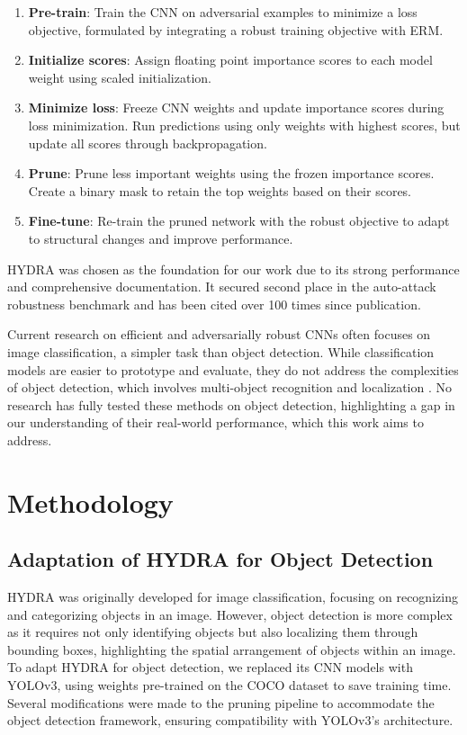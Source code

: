 \documentclass[10pt]{cai}
\begin{document}
\begin{enumerate}
    \item \textbf{Pre-train}: Train the CNN on adversarial examples to minimize a loss objective, formulated by integrating a robust training objective with ERM.
    \item \textbf{Initialize scores}: Assign floating point importance scores to each model weight using scaled initialization.
    \item \textbf{Minimize loss}: Freeze CNN weights and update importance scores during loss minimization. Run predictions using only weights with highest scores, but update all scores through backpropagation.
    \item \textbf{Prune}: Prune less important weights using the frozen importance scores. Create a binary mask to retain the top weights based on their scores.
    \item \textbf{Fine-tune}: Re-train the pruned network with the robust objective to adapt to structural changes and improve performance.
\end{enumerate}

HYDRA was chosen as the foundation for our work due to its strong performance and comprehensive documentation. It secured second place in the auto-attack robustness benchmark \cite{autoattack} and has been cited over 100 times since publication.

Current research on efficient and adversarially robust CNNs often focuses on image classification, a simpler task than object detection. While classification models are easier to prototype and evaluate, they do not address the complexities of object detection, which involves multi-object recognition and localization \cite{10099639}. No research has fully tested these methods on object detection, highlighting a gap in our understanding of their real-world performance, which this work aims to address.


\section{Methodology}
\subsection{Adaptation of HYDRA for Object Detection}
HYDRA was originally developed for image classification, focusing on recognizing and categorizing objects in an image. However, object detection is more complex as it requires not only identifying objects but also localizing them through bounding boxes, highlighting the spatial arrangement of objects within an image. To adapt HYDRA for object detection, we replaced its CNN models with YOLOv3, using weights pre-trained on the COCO dataset to save training time. Several modifications were made to the pruning pipeline to accommodate the object detection framework, ensuring compatibility with YOLOv3's architecture.
\end{document}
